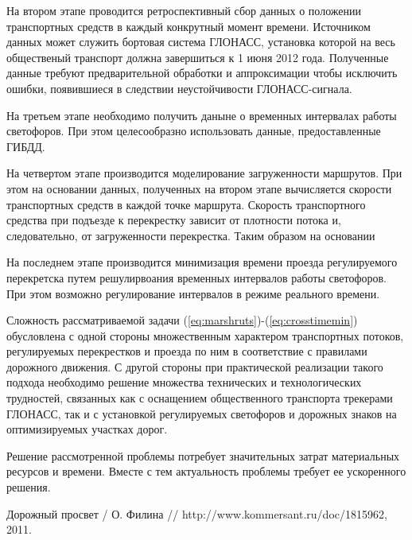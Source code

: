 \documentclass[a4paper,13pt]{article}
\begin{document}
На втором этапе проводится ретроспективный сбор данных о положении транспортных средств в каждый конкрутный момент времени. Источником данных может служить бортовая система ГЛОНАСС, установка которой на весь общественый транспорт должна завершиться к 1 июня 2012 года. Полученные данные требуют предварительной обработки и аппроксимации чтобы исключить ошибки, появившиеся в следствии неустойчивости ГЛОНАСС-сигнала.

На третьем этапе необходимо получить даныне о временных интервалах работы светофоров. При этом целесообразно использовать данные, предоставленные ГИБДД.

На четвертом этапе производится моделирование загруженности маршрутов. При этом на основании данных, полученных на втором этапе вычисляется скорости транспортных средств в каждой точке маршрута. Скорость транспортного средства при подъезде к перекрестку зависит от плотности потока и, следовательно, от загруженности перекрестка. Таким образом на основании 

На последнем этапе производится минимизация времени проезда регулируемого перекретска путем решулирвоания временных интервалов работы светофоров. При этом возможно регулирование интервалов в режиме реального времени.

Сложность рассматриваемой задачи (\ref{eq:marshruts})-(\ref{eq:crosstimemin}) обусловлена с одной стороны множественным характером транспортных потоков, регулируемых перекрестков и проезда по ним в соответствие с правилами дорожного движения. С другой стороны при практической реализации такого подхода необходимо решение множества технических и технологических трудностей, связанных как с оснащением общественного транспорта трекерами ГЛОНАСС, так и с установкой регулируемых светофоров и дорожных знаков на оптимизируемых участках дорог.

Решение рассмотренной проблемы потребует значительных затрат материальных ресурсов и времени. Вместе с тем актуальность проблемы требует ее ускоренного решения.

\begin{thebibliography}{1}
Дорожный просвет / О. Филина // http://www.kommersant.ru/doc/1815962, 2011.
\end{thebibliography}
\end{document}
